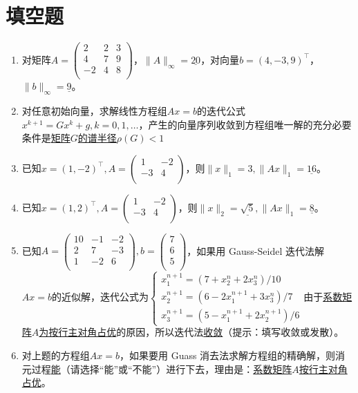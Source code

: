 \documentclass[UTF8,a4paper,11pt,oneside]{ctexbook}
\begin{document}
\section{填空题}
\begin{enumerate}
    \item 对矩阵\(A=\begin{pmatrix}
        2 & 2 & 3 \\
        4 & 7 & 9 \\
        -2 & 4 & 8 \\
    \end{pmatrix}\)，\(\|A\|_\infty=\underline{20}\)，对向量\(b=(4,-3,9)^\top\)，\(\|b\|_\infty=\underline{9}\)。
    \item 对任意初始向量，求解线性方程组\(Ax=b\)的迭代公式\(x^{k+1}=Gx^k+g,k=0,1,\ldots\)，产生的向量序列收敛到方程组唯一解的充分必要条件是\underline{矩阵\(G\)的谱半径\(\rho(G)<1\)}
    \item 已知\(x=(1,-2)^\top,A=\begin{pmatrix}
        1 & -2 \\
        -3 & 4 \\
    \end{pmatrix}\)，则\(\|x\|_1=3,\|Ax\|_1=\underline{16}\)。
    \item 已知\(x=(1,2)^\top,A=\begin{pmatrix}
        1 & -2 \\
        -3 & 4 \\
    \end{pmatrix}\)，则\(\|x\|_2=\underline{\sqrt{5}},\|Ax\|_1=\underline{8}\)。
    \item 已知\(A=\begin{pmatrix}
        10 & -1 & -2 \\
        2 & 7 & -3 \\
        1 & -2 & 6 \\
    \end{pmatrix},b=\begin{pmatrix}
        7 \\
        6 \\
        5 \\
    \end{pmatrix}\)，如果用 Gauss-Seidel 迭代法解\(Ax=b\)的近似解，迭代公式为\(\begin{cases}
        x_1^{n+1}=(7+x_2^n+2x_3^n)/10\\
        x_2^{n+1}=(6-2x_1^{n+1}+3x_3^n)/7\\
        x_3^{n+1}=(5-x_1^{n+1}+2x_2^{n+1})/6
    \end{cases}\)由于\underline{系数矩阵\(A\)为按行主对角占优}的原因，所以迭代法\underline{收敛}（提示：填写收敛或发散）。
    \item 对上题的方程组\(Ax=b\)，如果要用 Guass 消去法求解方程组的精确解，则消元过程\underline{能}（请选择“能”或“不能”）进行下去，理由是：\underline{系数矩阵\(A\)按行主对角占优}。
\end{enumerate}
\end{document}
